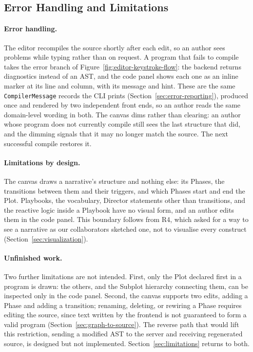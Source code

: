\subsection{Error Handling and Limitations}
\label{sec:editor-limitations}
 
\paragraph{Error handling.} The editor recompiles the source shortly after each edit, so an author sees problems while typing rather than on request. A program that fails to compile takes the error branch of Figure~\ref{fig:editor-keystroke-flow}: the backend returns diagnostics instead of an AST, and the code panel shows each one as an inline marker at its line and column, with its message and hint. These are the same \lstinline|CompilerMessage| records the CLI prints (Section~\ref{sec:error-reporting}), produced once and rendered by two independent front ends, so an author reads the same domain-level wording in both. The canvas dims rather than clearing: an author whose program does not currently compile still sees the last structure that did, and the dimming signals that it may no longer match the source. The next successful compile restores it.
 
\paragraph{Limitations by design.} The canvas draws a narrative's structure and nothing else: its Phases, the transitions between them and their triggers, and which Phases start and end the Plot. Playbooks, the vocabulary, Director statements other than transitions, and the reactive logic inside a Playbook have no visual form, and an author edits them in the code panel. This boundary follows from R4, which asked for a way to see a narrative as our collaborators sketched one, not to visualise every construct (Section~\ref{sec:visualization}).
 
\paragraph{Unfinished work.} Two further limitations are not intended. First, only the Plot declared first in a program is drawn: the others, and the Subplot hierarchy connecting them, can be inspected only in the code panel. Second, the canvas supports two edits, adding a Phase and adding a transition; renaming, deleting, or rewiring a Phase requires editing the source, since text written by the frontend is not guaranteed to form a valid program (Section~\ref{sec:graph-to-source}). The reverse path that would lift this restriction, sending a modified AST to the server and receiving regenerated source, is designed but not implemented. Section~\ref{sec:limitations} returns to both.
 

